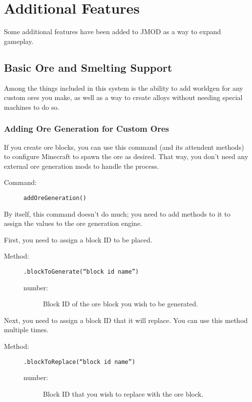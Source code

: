 \documentclass[letterpaper,titlepage,12pt]{article}
\begin{document}
\section{Additional Features}

Some additional features have been added to JMOD as a way to expand gameplay.

\subsection{Basic Ore and Smelting Support}

Among the things included in this system is the ability to add worldgen for any custom ores you make, as well as a way to create alloys without needing special machines to do so.

\subsubsection{Adding Ore Generation for Custom Ores}

If you create ore blocks, you can use this command (and its attendent methods) to configure Minecraft to spawn the ore as desired.  That way, you don't need any external ore generation mods to handle the process.

\begin{description}
\item[Command:] \texttt{addOreGeneration()}
\end{description}

By itself, this command doesn't do much; you need to add methods to it to assign the values to the ore generation engine.

First, you need to assign a block ID to be placed.

\begin{description}
\item[Method:] \texttt{.blockToGenerate(``block id name'')}
\begin{description}
\item [number:] Block ID of the ore block you wish to be generated.
\end{description}
\end{description}

Next, you need to assign a block ID that it will replace.  You can use this method multiple times.

\begin{description}
\item[Method:] \texttt{.blockToReplace(``block id name'')}
\begin{description}
\item [number:] Block ID that you wish to replace with the ore block.
\end{description}
\end{description}
\end{document}
